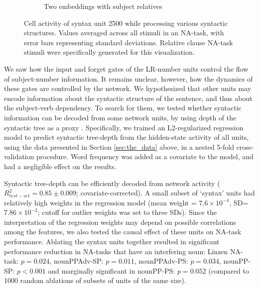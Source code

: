 \begin{figure}[t]
\begin{subfigure}{\textwidth}
            \caption{Two embeddings with subject relatives}
            \label{fig:syntax-unit-double-subjrel}
    \end{subfigure}
\caption{Cell activity of syntax unit \unit{2}{500} while processing various syntactic structures. Values averaged across all stimuli in an NA-task, with error bars representing standard deviations. Relative clause NA-task stimuli were specifically generated for this visualization. }
\end{figure}

We saw how the input and forget gates of the LR-number units control the flow
of subject-number information. It remains unclear, however, how the dynamics of these gates are controlled by the network. We hypothesized
that other units may encode information about the syntactic structure
of the sentence, and thus about the subject-verb dependency. To
search for them, we tested whether syntactic information can be
decoded from some network units, by using depth of the
syntactic tree as a proxy \cite{Nelson:etal:2017}. Specifically, we
trained an L2-regularized regression model to predict syntactic
tree-depth from the hidden-state activity of all units, using the data
presented in Section \ref{sec:the_data} above, in a nested 5-fold
cross-validation procedure. %
Word frequency was added as a covariate
to the model, and had a negligible effect on the results.

Syntactic tree-depth can be efficiently decoded from network activity
($R^2_{test-set}=0.85\pm0.009$; covariate-corrected). A small subset of `syntax' units had relatively high weights in the regression model (mean weight = $7.6\times{}10^{-4}$, SD=$7.86\times{}10^{-2}$; cutoff for outlier weights was set to three SDs). Since the interpretation of the regression weights may depend on possible correlations among the features, we also tested the causal effect of these units on NA-task performance. Ablating the syntax units together resulted in significant performance reduction in NA-tasks that have an interfering noun: Linzen NA-task: $p=0.024$, nounPPAdv-SP: $p=0.011$, nounPPAdv-PS: $p=0.034$, nounPP-SP: $p<0.001$ and marginally significant in nounPP-PS: $p=0.052$ (compared to 1000 random ablations of subsets of units of the same size).

